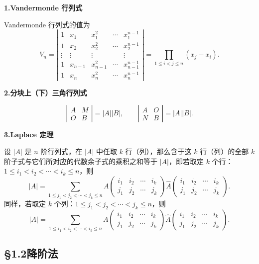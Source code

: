 \documentclass[UTF8, 12pt, fontset=fandol, oneside]{ctexart}
\begin{document}
\noindent\textbf{1.\quad Vandermonde 行列式}

Vandermonde 行列式的值为
\[
V_n=
\left|\begin{array}{ccccc}
1 & x_1 & x_1^2 & \cdots & x_1^{n-1}\\
1 & x_2 & x_2^2 & \cdots & x_2^{n-1}\\
\vdots & \vdots & \vdots &        & \vdots\\
1 & x_{n-1} & x_{n-1}^2 & \cdots & x_{n-1}^{n-1}\\
1 & x_n & x_n^2 & \cdots & x_n^{n-1}
\end{array}\right|
=\prod_{1\le i<j\le n}(x_j-x_i).
\]

\noindent\textbf{2.\quad 分块上（下）三角行列式}

\[
\left|\begin{array}{cc}
A & M\\
O & B
\end{array}\right|=|A||B|,\qquad
\left|\begin{array}{cc}
A & O\\
N & B
\end{array}\right|=|A||B|.
\]

\noindent\textbf{3.\quad Laplace 定理}

设 $|A|$ 是 $n$ 阶行列式，在 $|A|$ 中任取 $k$ 行（列），那么含于这 $k$ 行（列）的全部 $k$ 阶子式与它们所对应的代数余子式的乘积之和等于 $|A|$，即若取定 $k$ 个行：$1\le i_1<i_2<\cdots<i_k\le n$，则
\[
|A|=
\sum_{1\le j_1<j_2<\cdots<j_k\le n}
A\begin{pmatrix}
i_1 & i_2 & \cdots & i_k\\
j_1 & j_2 & \cdots & j_k
\end{pmatrix}
\widehat{A}\begin{pmatrix}
i_1 & i_2 & \cdots & i_k\\
j_1 & j_2 & \cdots & j_k
\end{pmatrix}.
\]
同样，若取定 $k$ 个列：$1\le j_1<j_2<\cdots<j_k\le n$，则
\[
|A|=
\sum_{1\le i_1<i_2<\cdots<i_k\le n}
A\begin{pmatrix}
i_1 & i_2 & \cdots & i_k\\
j_1 & j_2 & \cdots & j_k
\end{pmatrix}
\widehat{A}\begin{pmatrix}
i_1 & i_2 & \cdots & i_k\\
j_1 & j_2 & \cdots & j_k
\end{pmatrix}.
\]

\subsection*{§1.2\quad 降阶法}
\end{document}
